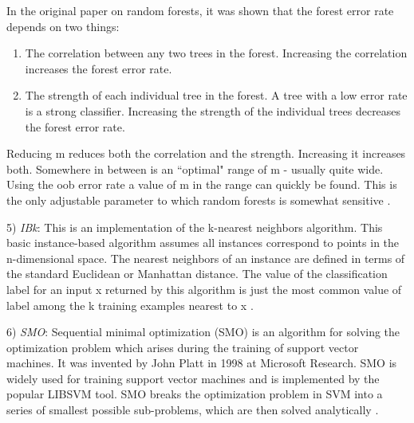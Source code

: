 \documentclass[conference]{IEEEtran}
\begin{document}
In the original paper on random forests, it was shown that the forest error rate depends on two things:

\begin{enumerate}
\item The correlation between any two trees in the forest. Increasing the correlation increases the forest error rate.
\item The strength of each individual tree in the forest. A tree with a low error rate is a strong classifier. Increasing the strength of the individual trees decreases the forest error rate.
\end{enumerate}

Reducing m reduces both the correlation and the strength. Increasing it increases both. Somewhere in between is an ``optimal" range of m - usually quite wide. Using the oob error rate a value of m in the range can quickly be found. This is the only adjustable parameter to which random forests is somewhat sensitive \cite{breiman}.

5) \textit{IBk}: This is an implementation of the k-nearest neighbors algorithm. This basic instance-based algorithm assumes all instances correspond to points in the n-dimensional space. The nearest neighbors of an instance are defined in terms of the standard Euclidean or Manhattan distance. The value of the classification label for an input x returned by this algorithm is just the most common value of label among the k training examples nearest to x \cite{Mitchell}.

6) \textit{SMO}: Sequential minimal optimization (SMO) is an algorithm for solving the optimization problem which arises during the training of support vector machines. It was invented by John Platt in 1998 at Microsoft Research. SMO is widely used for training support vector machines and is implemented by the popular LIBSVM tool. SMO breaks the optimization problem in SVM into a series of smallest possible sub-problems, which are then solved analytically \cite{smo}.
\end{document}
